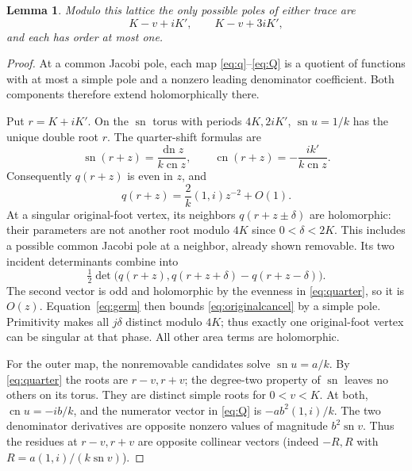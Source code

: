\documentclass[11pt]{article}
\newtheorem{lemma}{Lemma}
\newcommand{\sn}{\operatorname{sn}}
\newcommand{\cn}{\operatorname{cn}}
\newcommand{\dn}{\operatorname{dn}}
\begin{document}
\begin{lemma}\label{lem:poles}
Modulo this lattice the only possible poles of either trace are
\begin{equation}\label{eq:poles}
 K-v+iK',\qquad K-v+3iK',
\end{equation}
and each has order at most one.
\end{lemma}
\begin{proof}
At a common Jacobi pole, each map \eqref{eq:q}--\eqref{eq:Q}
is a quotient of functions with at most a simple pole and a nonzero
leading denominator coefficient. Both components therefore extend
holomorphically there.

Put $r=K+iK'$. On the $\sn$ torus with periods $4K,2iK'$,
$\sn u=1/k$ has the unique double root $r$. The quarter-shift formulas are
\begin{equation}\label{eq:quarter}
 \sn(r+z)=\frac{\dn z}{k\cn z},\qquad
 \cn(r+z)=-\frac{i k'}{k\cn z}.
\end{equation}
Consequently $q(r+z)$ is even in $z$, and
\begin{equation}\label{eq:germ}
 q(r+z)=\frac{2}{k}(1,i)z^{-2}+O(1).
\end{equation}
At a singular original-foot vertex, its neighbors
$q(r+z\pm\delta)$ are holomorphic: their parameters are not another
root modulo $4K$ since $0<\delta<2K$.
This includes a possible common Jacobi pole at a neighbor, already
shown removable. Its two incident determinants combine into
\begin{equation}\label{eq:originalcancel}
 \tfrac12\det\bigl(q(r+z),q(r+z+\delta)-q(r+z-\delta)\bigr).
\end{equation}
The second vector is odd and holomorphic by the evenness in
\eqref{eq:quarter}, so it is $O(z)$. Equation~\eqref{eq:germ}
then bounds \eqref{eq:originalcancel} by a simple pole.
Primitivity makes all $j\delta$ distinct modulo $4K$; thus exactly
one original-foot vertex can be singular at that phase. All other
area terms are holomorphic.

For the outer map, the nonremovable candidates solve $\sn u=a/k$.
By \eqref{eq:quarter} the roots are $r-v,r+v$; the degree-two
property of $\sn$ leaves no others on its torus. They are distinct
simple roots for $0<v<K$. At both, $\cn u=-ib/k$, and the numerator
vector in \eqref{eq:Q} is
$-ab^2(1,i)/k$. The two denominator derivatives are opposite nonzero
values of magnitude $b^2\sn v$. Thus the residues at $r-v,r+v$
are opposite collinear vectors (indeed $-R,R$ with
$R=a(1,i)/(k\sn v)$).


\end{proof}
\end{document}
